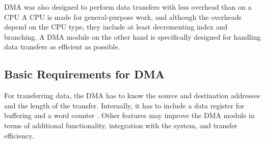 DMA was also designed to perform data transfers with less overhead than on a CPU \cite{encyclopedia}
A CPU is made for general-purpose work, and although the overheads depend on the CPU type, they include at least decrementing index and branching.
A DMA module on the other hand is specifically designed for handling data transfers as efficient as possible. 

\subsection{Basic Requirements for DMA}
For transferring data, the DMA has to know the source and destination addresses and the length of the transfer.
Internally, it has to include a data register for buffering and a word counter \cite{encyclopedia}.
Other features may improve the DMA module in terms of additional functionality, integration with the system, and transfer efficiency.


